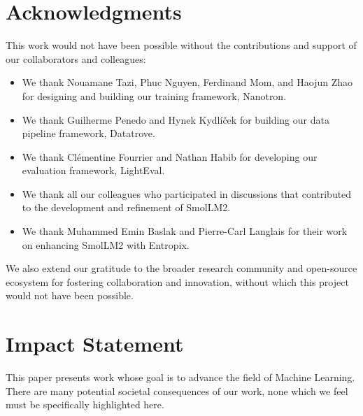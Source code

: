 \documentclass{article}
\theoremstyle{plain}
\theoremstyle{definition}
\theoremstyle{remark}
\begin{document}
\section*{Acknowledgments}
\label{app:acknowledgments}

This work would not have been possible without the contributions and support of our collaborators and colleagues:

\begin{itemize}
    \item We thank Nouamane Tazi, Phuc Nguyen, Ferdinand Mom, and Haojun Zhao for designing and building our training framework, Nanotron.
    \item We thank Guilherme Penedo and Hynek Kydlíček for building our data pipeline framework, Datatrove.
    \item We thank Clémentine Fourrier and Nathan Habib for developing our evaluation framework, LightEval.
    \item We thank all our colleagues who participated in discussions that contributed to the development and refinement of SmolLM2.
    \item We thank Muhammed Emin Baslak and Pierre-Carl Langlais for their work on enhancing SmolLM2 with Entropix.
\end{itemize}

We also extend our gratitude to the broader research community and open-source ecosystem for fostering collaboration and innovation, without which this project would not have been possible.

\section*{Impact Statement}
This paper presents work whose goal is to advance the field of Machine Learning. There are many potential societal consequences of our work, none which we feel must be specifically highlighted here.




\newpage
\appendix
\onecolumn
\end{document}
